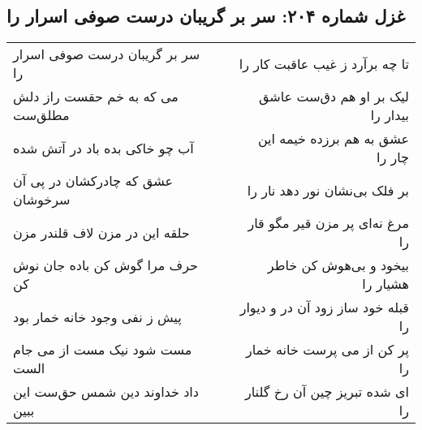 \begin{center}
\section*{غزل شماره ۲۰۴: سر بر گریبان درست صوفی اسرار را}
\label{sec:0204}
\begin{longtable}{l p{0.5cm} r}
سر بر گریبان درست صوفی اسرار را
&&
تا چه برآرد ز غیب عاقبت کار را
\\
می که به خم حقست راز دلش مطلق‌ست
&&
لیک بر او هم دق‌ست عاشق بیدار را
\\
آب چو خاکی بده باد در آتش شده
&&
عشق به هم برزده خیمه این چار را
\\
عشق که چادرکشان در پی آن سرخوشان
&&
بر فلک بی‌نشان نور دهد نار را
\\
حلقه این در مزن لاف قلندر مزن
&&
مرغ نه‌ای پر مزن قیر مگو قار را
\\
حرف مرا گوش کن باده جان نوش کن
&&
بیخود و بی‌هوش کن خاطر هشیار را
\\
پیش ز نفی وجود خانه خمار بود
&&
قبله خود ساز زود آن در و دیوار را
\\
مست شود نیک مست از می جام الست
&&
پر کن از می پرست خانه خمار را
\\
داد خداوند دین شمس حق‌ست این ببین
&&
ای شده تبریز چین آن رخ گلنار را
\\
\end{longtable}
\end{center}
